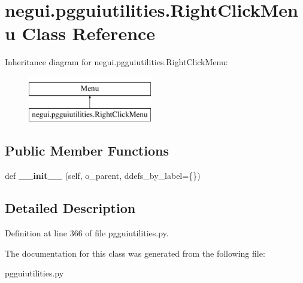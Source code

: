 \hypertarget{classnegui_1_1pgguiutilities_1_1RightClickMenu}{}\section{negui.\+pgguiutilities.\+Right\+Click\+Menu Class Reference}
\label{classnegui_1_1pgguiutilities_1_1RightClickMenu}
Inheritance diagram for negui.\+pgguiutilities.\+Right\+Click\+Menu\+:\begin{figure}[H]
\begin{center}
\leavevmode
\includegraphics[height=2.000000cm]{classnegui_1_1pgguiutilities_1_1RightClickMenu}
\end{center}
\end{figure}
\subsection*{Public Member Functions}
\begin{DoxyCompactItemize}
\item 
def {\bfseries \+\_\+\+\_\+init\+\_\+\+\_\+} (self, o\+\_\+parent, ddefs\+\_\+by\+\_\+label=\{\})\hypertarget{classnegui_1_1pgguiutilities_1_1RightClickMenu_aab8007e84f6b850f61937784fd9835a3}{}\label{classnegui_1_1pgguiutilities_1_1RightClickMenu_aab8007e84f6b850f61937784fd9835a3}

\end{DoxyCompactItemize}


\subsection{Detailed Description}


Definition at line 366 of file pgguiutilities.\+py.



The documentation for this class was generated from the following file\+:\begin{DoxyCompactItemize}
\item 
pgguiutilities.\+py\end{DoxyCompactItemize}
